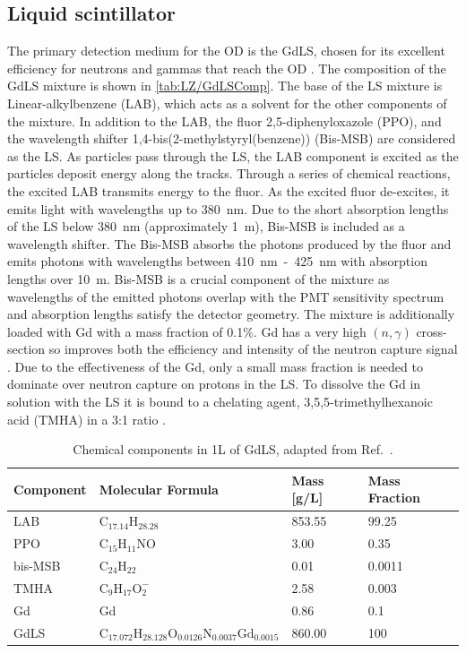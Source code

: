 \subsection{Liquid scintillator}\label{sec:LZ/LS}
The primary detection medium for the OD is the GdLS, chosen for its excellent efficiency for neutrons and gammas that reach the OD \cite{LZTDR}. The composition of the GdLS mixture is shown in \autoref{tab:LZ/GdLSComp}. The base of the LS mixture is Linear-alkylbenzene (LAB), which acts as a solvent for the other components of the mixture. In addition to the LAB, the fluor 2,5-diphenyloxazole (PPO), and the wavelength shifter 1,4-bis(2-methylstyryl(benzene)) (Bis-MSB) are considered as the LS. As particles pass through the LS, the LAB component is excited as the particles deposit energy along the tracks. Through a series of chemical reactions, the excited LAB transmits energy to the fluor. As the excited fluor de-excites, it emits light with wavelengths up to 380~nm. Due to the short absorption lengths of the LS below 380~nm (approximately 1~m), Bis-MSB is included as a wavelength shifter. The Bis-MSB absorbs the photons produced by the fluor and emits photons with wavelengths between 410~nm~-~425~nm with absorption lengths over 10~m. Bis-MSB is a crucial component of the mixture as wavelengths of the emitted photons overlap with the PMT sensitivity spectrum and absorption lengths satisfy the detector geometry.
The mixture is additionally loaded with Gd with a mass fraction of 0.1\%. Gd has a very high $(n,\gamma)$ cross-section so improves both the efficiency and intensity of the neutron capture signal \cite{LZTDR}. Due to the effectiveness of the Gd, only a small mass fraction is needed to dominate over neutron capture on protons in the LS. To dissolve the Gd in solution with the LS it is bound to a chelating agent, 3,5,5-trimethylhexanoic acid (TMHA) in a 3:1 ratio \cite{LZTDR,Haselschwardt:2018vmp}.
\begin{table}[!ht]
    \centering
    \caption[Chemical components in 1L of GdLS.]{Chemical components in 1L of GdLS, adapted from Ref.~\cite{Haselschwardt:2018vmp}.}
    \begin{tabular}{llll}
        \hline\hline
        \textbf{Component} & \textbf{Molecular Formula} & \textbf{Mass [g/L]} & \textbf{Mass Fraction} \\
        \hline
        LAB & $\text{C}_{17.14}\text{H}_{28.28}$ & 853.55 & 99.25\\
        PPO & $\text{C}_{15}\text{H}_{11}\text{NO}$ & 3.00 & 0.35 \\
        bis-MSB & $\text{C}_{24}\text{H}_{22}$ & 0.01 & 0.0011\\
        TMHA & $\text{C}_{9}\text{H}_{17}\text{O}_{2}^{-}$ & 2.58 & 0.003\\
        Gd & Gd & 0.86 & 0.1 \\
        \hline
        GdLS & $\text{C}_{17.072} \text{H}_{28.128} \text{O}_{0.0126} \text{N}_{0.0037} \text{Gd}_{0.0015}$ & 860.00 & 100 \\
        \hline\hline
    \end{tabular}
    \label{tab:LZ/GdLSComp}
\end{table}
